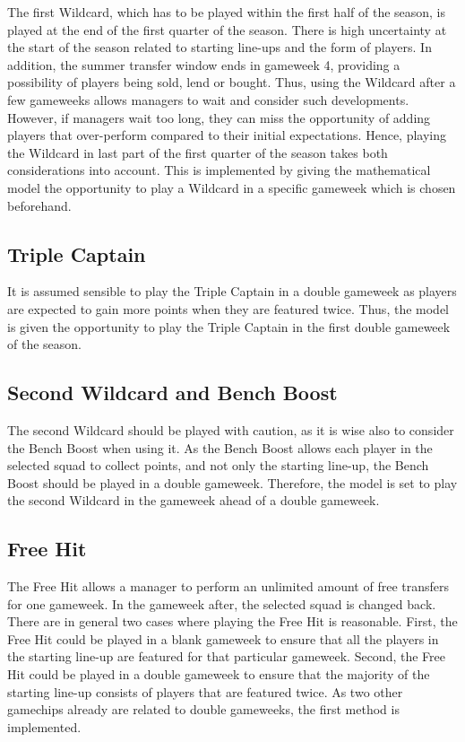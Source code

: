 The first Wildcard, which has to be played within the first half of the season, is played at the end of the first quarter of the season. There is high uncertainty at the start of the season related to starting line-ups and the form of players. In addition, the summer transfer window ends in gameweek 4, providing a possibility of players being sold, lend or bought. Thus, using the Wildcard after a few gameweeks allows managers to wait and consider such developments. However, if managers wait too long, they can miss the opportunity of adding players that over-perform compared to their initial expectations. Hence, playing the Wildcard in last part of the first quarter of the season takes both considerations into account. This is implemented by giving the mathematical model the opportunity to play a Wildcard in a specific gameweek which is chosen beforehand.

\subsection{Triple Captain}
It is assumed sensible to play the Triple Captain in a double gameweek as players are expected to gain more points when they are featured twice. Thus, the model is given the opportunity to play the Triple Captain in the first double gameweek of the season. 

\subsection{Second Wildcard and Bench Boost}
The second Wildcard should be played with caution, as it is wise also to consider the Bench Boost when using it. As the Bench Boost allows each player in the selected squad to collect points, and not only the starting line-up, the Bench Boost should be played in a double gameweek. Therefore, the model is set to play the second Wildcard in the gameweek ahead of a double gameweek.


\subsection{Free Hit}
The Free Hit allows a manager to perform an unlimited amount of free transfers for one gameweek. In the gameweek after, the selected squad is changed back. There are in general two cases where playing the Free Hit is reasonable. First, the Free Hit could be played in a blank gameweek to ensure that all the players in the starting line-up are featured for that particular gameweek. Second, the Free Hit could be played in a double gameweek to ensure that the majority of the starting line-up consists of players that are featured twice. As two other gamechips already are related to double gameweeks, the first method is implemented.

